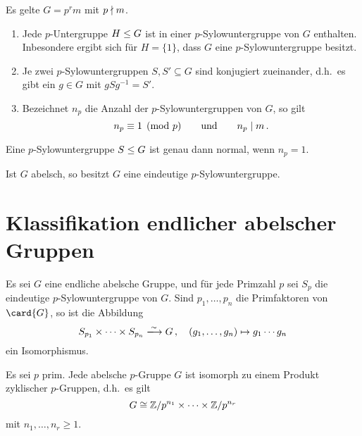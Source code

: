 \begin{theorem}[Sylowsätze]
  Es gelte $G = p^r m$ mit $p \mathrel{\nmid} m$.
  \begin{enumerate}
    \item
      Jede $p$-Untergruppe $H \mathrel{\leq} G$ ist in einer $p$-Sylowuntergruppe von $G$ enthalten.
      Inbesondere ergibt sich für $H = \{1\}$, dass $G$ eine $p$-Sylowuntergruppe besitzt.
    \item
      Je zwei $p$-Sylowuntergruppen $S, S' \subseteq G$ sind konjugiert zueinander, d.h.\ es gibt ein $g \in G$ mit $g S g^{-1} = S'$.
    \item
      Bezeichnet $n_p$ die Anzahl der $p$-Sylowuntergruppen von $G$, so gilt
      \[
                n_p
        \equiv  1
        \pmod{p}
        \qquad\text{und}\qquad
        n_p \mathrel{|} m \,.
      \]
  \end{enumerate}
\end{theorem}

\begin{corollary}
  Eine $p$-Sylowuntergruppe $S \mathrel{\leq} G$ ist genau dann normal, wenn $n_p = 1$.
\end{corollary}

\begin{corollary}
  Ist $G$ abelsch, so besitzt $G$ eine eindeutige $p$-Sylowuntergruppe.
\end{corollary}





\section{Klassifikation endlicher abelscher Gruppen}


\begin{theorem}
  Es sei $G$ eine endliche abelsche Gruppe, und für jede Primzahl $p$ sei $S_p$ die eindeutige $p$-Sylowuntergruppe von $G$.
  Sind $p_1, \dotsc, p_n$ die Primfaktoren von $\card{G}$, so ist die Abbildung
  \[
                            S_{p_1} \times \dotsb \times S_{p_n}
    \xlongrightarrow{\sim}  G \,,
    \quad                   (g_1, \dotsc, g_n)
    \mapsto                 g_1 \dotsm g_n
  \]
  ein Isomorphismus.
\end{theorem}

\begin{proposition}
  Es sei $p$ prim.
  Jede abelsche $p$-Gruppe $G$ ist isomorph zu einem Produkt zyklischer $p$-Gruppen, d.h.\ es gilt
  \[
          G
    \cong \mathbb{Z}/p^{n_1} \times \dotsm \times \mathbb{Z}/p^{n_r}
  \]
  mit $n_1, \dotsc, n_r \geq 1$.
\end{proposition}

